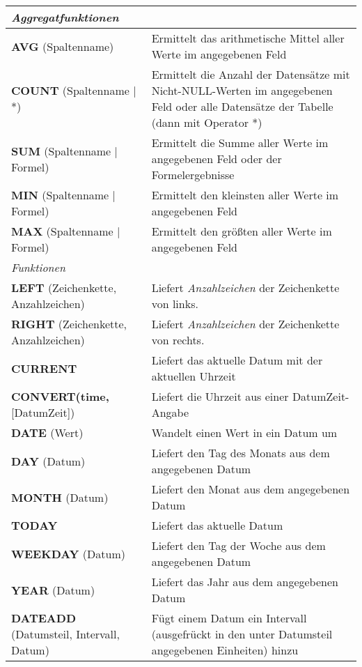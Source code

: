 \begin{center}
	\setlength\arrayrulewidth{1pt}
	\begin{tabular}{|p{} | p{}|}
		\hline
		\rowcolor{tableLightGray} \textit{Aggregatfunktionen} & \\
		\hline
		\textbf{AVG} (Spaltenname) & Ermittelt das arithmetische Mittel aller Werte im angegebenen Feld\\
		\hline
		\textbf{COUNT} (Spaltenname | *) & Ermittelt die Anzahl der Datensätze mit Nicht-NULL-Werten im angegebenen Feld oder alle Datensätze der Tabelle (dann mit Operator *)\\
		\hline
		\textbf{SUM} (Spaltenname | Formel) & Ermittelt die Summe aller Werte im angegebenen Feld oder der Formelergebnisse\\
		\hline
		\textbf{MIN} (Spaltenname | Formel) & Ermittelt den kleinsten aller Werte im angegebenen Feld\\
		\hline
		\textbf{MAX} (Spaltenname | Formel) & Ermittelt den größten aller Werte im angegebenen Feld\\
		\hline
		\rowcolor{tableLightGray} \textit{Funktionen} & \\
		\hline
		\textbf{LEFT} (Zeichenkette, Anzahlzeichen) & Liefert \textit{Anzahlzeichen} der Zeichenkette von links.\\
		\hline
		\textbf{RIGHT} (Zeichenkette, Anzahlzeichen) & Liefert \textit{Anzahlzeichen} der Zeichenkette von rechts.\\
		\hline
		\textbf{CURRENT} & Liefert das aktuelle Datum mit der aktuellen Uhrzeit\\
		\hline
		\textbf{CONVERT(time,}[DatumZeit]) & Liefert die Uhrzeit aus einer DatumZeit-Angabe\\
		\hline
		\textbf{DATE} (Wert) & Wandelt einen Wert in ein Datum um\\
		\hline
		\textbf{DAY} (Datum) & Liefert den Tag des Monats aus dem angegebenen Datum\\
		\hline
		\textbf{MONTH} (Datum) & Liefert den Monat aus dem angegebenen Datum\\
		\hline
		\textbf{TODAY} & Liefert das aktuelle Datum\\
		\hline
		\textbf{WEEKDAY} (Datum) & Liefert den Tag der Woche aus dem angegebenen Datum\\
		\hline
		\textbf{YEAR} (Datum) & Liefert das Jahr aus dem angegebenen Datum\\
		\hline
		\textbf{DATEADD} (Datumsteil, Intervall, Datum) & Fügt einem Datum ein Intervall (ausgefrückt in den unter Datumsteil angegebenen Einheiten) hinzu\\

\end{tabular}
\end{center}
